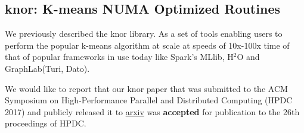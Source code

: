 \documentclass[simplex.tex]{subfiles}
\begin{document}
\subsection{knor: K-means NUMA Optimized Routines}

We previously described the \textsf{knor} library. As a set of tools enabling
users to perform the popular k-means algorithm at scale at speeds of 10x-100x
time of that of popular frameworks in use today like Spark's MLlib, H$^2$O
and GraphLab(Turi, Dato).

We would like to report that our \textsf{knor} paper that was submitted
to the ACM Symposium on High-Performance Parallel and Distributed Computing (HPDC 2017)
and publicly released it to \href{https://arxiv.org/abs/1606.08905}{arxiv}
was \textbf{accepted} for publication to the 26th proceedings of HPDC.
\end{document}
